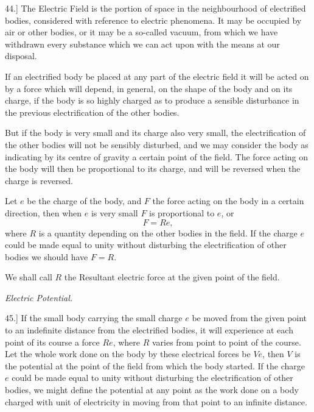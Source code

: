 \documentclass[11pt,a4paper]{article}
\begin{document}
44.] The Electric Field is the portion of space in the neighbourhood of
electrified bodies, considered with reference to electric phenomena. It
may be occupied by air or other bodies, or it may be a so-called
vacuum, from which we have withdrawn every substance which we can act
upon with the means at our disposal.

If an electrified body be placed at any part of the electric field it
will be acted on by a force which will depend, in general, on the shape
of the body and on its charge, if the body is so highly charged as to
produce a sensible disturbance in the previous electrification of the
other bodies.

But if the body is very small and its charge also very small, the
electrification of the other bodies will not be sensibly disturbed, and
we may consider the body as indicating by its centre of gravity a
certain point of the field. The force acting on the body will then be
proportional to its charge, and will be reversed when the charge is
reversed.

\clearpage
\setcounter{footnote}{0}

Let \(e\) be the charge of the body, and \(F\) the force acting on the
body in a certain direction, then when \(e\) is very small \(F\) is
proportional to \(e\), or
\[
  F = R e,
\]
where \(R\) is a quantity depending on the other bodies in the field.
If the charge \(e\) could be made equal to unity without disturbing the
electrification of other bodies we should have \(F=R\).

We shall call \(R\) the Resultant electric force at the given point of
the field.

\begin{center}
\textit{Electric Potential.}
\end{center}

45.] If the small body carrying the small charge \(e\) be moved from the
given point to an indefinite distance from the electrified bodies, it
will experience at each point of its course a force \(R e\), where \(R\)
varies from point to point of the course. Let the whole work done on the
body by these electrical forces be \(V e\), then \(V\) is the potential
at the point of the field from which the body started. If the charge
\(e\) could be made equal to unity without disturbing the electrification
of other bodies, we might define the potential at any point as the work
done on a body charged with unit of electricity in moving from that
point to an infinite distance.
\end{document}
